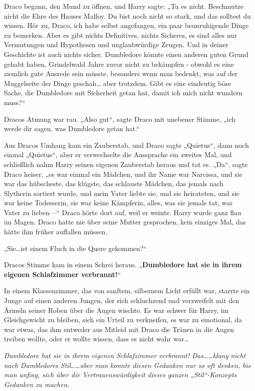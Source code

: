 {Draco begann, den Mund zu öffnen, und Harry sagte: „Tu es nicht. Beschmutze nicht die Ehre des Hauses Malfoy. Du bist noch nicht so stark, und das solltest du wissen. Hör zu, Draco, ich habe selbst angefangen, ein paar beunruhigende Dinge zu bemerken. Aber es gibt nichts Definitives, nichts Sicheres, es sind alles nur Vermutungen und Hypothesen und unglaubwürdige Zeugen. Und in deiner Geschichte ist auch nichts sicher. Dumbledore könnte einen anderen guten Grund gehabt haben, Grindelwald Jahre zuvor nicht zu bekämpfen - obwohl es eine ziemlich gute Ausrede sein müsste, besonders wenn man bedenkt, was auf der Muggelseite der Dinge geschah… aber trotzdem. Gibt es eine eindeutig böse Sache, die Dumbledore mit Sicherheit getan hat, damit ich mich nicht wundern muss?“

Dracos Atmung war rau. „Also gut“, sagte Draco mit unebener Stimme, „ich werde dir sagen, was Dumbledore getan hat.“

Aus Dracos Umhang kam ein Zauberstab, und Draco sagte „Quietus“, dann noch einmal „Quietus“, aber er verwechselte die Aussprache ein zweites Mal, und schließlich nahm Harry seinen eigenen Zauberstab heraus und tat es. „Da“, sagte Draco heiser, „es war einmal ein Mädchen, und ihr Name war Narcissa, und sie war das hübscheste, das klügste, das schlauste Mädchen, das jemals nach Slytherin sortiert wurde, und mein Vater liebte sie, und sie heirateten, und sie war keine Todesserin, sie war keine Kämpferin, alles, was sie jemals tat, war Vater zu lieben—“ Draco hörte dort auf, weil er weinte. Harry wurde ganz flau im Magen. Draco hatte nie über seine Mutter gesprochen, kein einziges Mal, das hätte ihm früher auffallen müssen.

„Sie…ist einem Fluch in die Quere gekommen?“

Dracos Stimme kam in einem Schrei heraus. „\textbf{Dumbledore hat sie in ihrem eigenen Schlafzimmer verbrannt!}“

In einem Klassenzimmer, das von sanftem, silbernem Licht erfüllt war, starrte ein Junge auf einen anderen Jungen, der sich schluchzend und verzweifelt mit den Ärmeln seiner Roben über die Augen wischte. Es war schwer für Harry, im Gleichgewicht zu bleiben, sich ein Urteil zu verkneifen, es war zu emotional, da war etwas, das ihm entweder aus Mitleid mit Draco die Tränen in die Augen treiben wollte, oder er wollte wissen, dass es nicht wahr war…

\emph{Dumbledore hat sie in ihrem eigenen Schlafzimmer verbrannt! Das……klang nicht nach Dumbledores Stil……aber man konnte diesen Gedanken nur so oft denken, bis man anfing, sich über die Vertrauenswürdigkeit dieses ganzen „Stil“-Konzepts Gedanken zu machen.}

}
